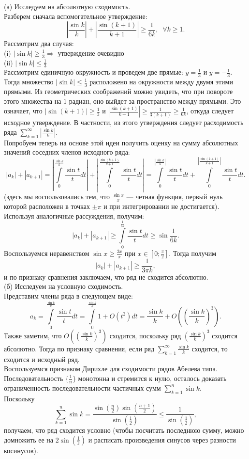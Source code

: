 \documentclass{article}
\begin{document}
(а) Исследуем на абсолютную сходимость.\\
Разберем сначала вспомогательное утверждение:
$$\left| \frac{\sin k}{k} \right| + \left| \frac{\sin (k+1)}{k+1} \right| \geqslant \frac{1}{6k},\;\; \forall k \geqslant 1.$$
Рассмотрим два случая:\\
(i) $|\sin k | \geqslant \frac13 \Rightarrow$ утверждение очевидно\\
(ii) $|\sin k| \leqslant \frac13$\\
Рассмотрим единичную окружность и проведем две прямые: $y=\frac13$ и $y=-\frac13$. Тогда множество $|\sin k| \leqslant \frac13$ расположено на окружности между двумя этими прямыми. 
Из геометрических соображений можно увидеть, что при повороте этого множества на $1$ радиан, оно выйдет за пространство между прямыми. Это означает, что $|\sin(k+1)| \geqslant \frac13$ и 
$\left| \frac{\sin(k+1)}{k+1} \right| \geqslant \frac{1}{3(k+1)} \geqslant \frac{1}{6k}$, откуда следует исходное утверждение. В частности, из этого утверждения следует расходимость ряда $\sum\limits_{k=1}^\infty \left| \frac{\sin k}{k} \right|$.\\
Попробуем теперь на основе этой идеи получить оценку на сумму абсолютных значений соседних членов исходного ряда:
$$|a_k| + |a_{k+1}| = \left| \int\limits_0^{\frac{\sin k}{k}} \frac{\sin t}{t} dt \right| + \left| \int\limits_0^{\frac{\sin (k+1)}{k+1}} \frac{\sin t}{t} dt \right| = \int\limits_0^{\left| \frac{\sin k}{k} \right|} \frac{\sin t}{t} dt + \int\limits_0^{\left| \frac{\sin (k+1)}{k+1} \right|} \frac{\sin t}{t} dt.$$
(здесь мы воспользовались тем, что $\frac{\sin x}{x}$ --- четная функция, первый нуль которой расположен в точках $\pm \pi$ и при интегрировании не достигается).
Используя аналогичные рассуждения, получим:
$$|a_k| + |a_{k+1}| \geqslant \int\limits_0^{\frac{1}{6k}} \frac{\sin t}{t} dt \geqslant \sin \frac{1}{6k}.$$
Воспользуемся неравенством $\sin x \geqslant \frac{2x}{\pi}$ при $x \in [0; \frac{\pi}{2}]$. Тогда получим
$$|a_k| + |a_{k+1}| \geqslant \frac{1}{3\pi k},$$
и по признаку сравнения заключаем, что ряд не сходится абсолютно.\\
(б) Исследуем на условную сходимость.\\
Представим члены ряда в следующем виде:
$$a_k = \int\limits_0^{\frac{\sin k}{k}} \frac{\sin t}{t} dt = \int\limits_0^{\frac{\sin k}{k}} 1 + O(t^2) dt = \frac{\sin k}{k} + O\left( \left( \frac{\sin k}{k} \right)^3 \right).$$
Также заметим, что $O\left( \left( \frac{\sin k}{k} \right)^3 \right)$ сходится, поскольку ряд $\left( \frac{\sin k}{k} \right)^3$ сходится абсолютно. Тогда по признаку сравнения, если ряд $\sum\limits_{k=1}^\infty \frac{\sin k}{k}$ сходится, то сходится и исходный ряд.\\
Воспользуемся признаком Дирихле для сходимости рядов Абелева типа. Последовательность $\{\frac{1}{n}\}$ монотонна и стремится к нулю, осталось доказать ограниченность последовательности 
частичных сумм $\sum\limits_{k=1}^n \sin k$.\\
Поскольку
$$\sum\limits_{k=1}^n \sin k = \frac{\sin(\frac{n}{2}) \sin(\frac{n+1}{2})}{\sin(\frac{1}{2})} \leqslant \frac{1}{\sin (\frac12)},$$
получаем, что ряд сходится условно (чтобы посчитать последнюю сумму, можно домножить ее на $2\sin(\frac12)$ и расписать произведения синусов через разности косинусов).
\end{document}
